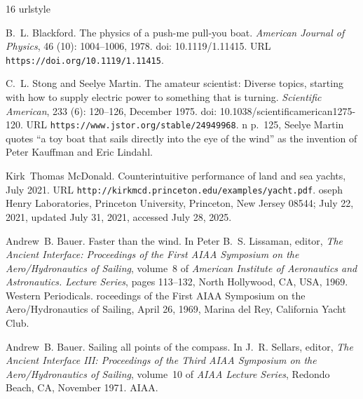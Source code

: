 \documentclass[a4paper]{article}
\begin{document}
\begin{thebibliography}{16}
\providecommand{\natexlab}[1]{#1}
\providecommand{\url}[1]{\texttt{#1}}
\expandafter\ifx\csname urlstyle\endcsname\relax
  \providecommand{\doi}[1]{doi: #1}\else
  \providecommand{\doi}{doi: \begingroup \urlstyle{rm}\Url}\fi

B.~L. Blackford.
\newblock The physics of a push-me pull-you boat.
\newblock \emph{American Journal of Physics}, 46 (10):
  1004--1006, 1978.
\newblock \doi{10.1119/1.11415}.
\newblock URL \url{https://doi.org/10.1119/1.11415}.

C.~L. Stong and Seelye Martin.
\newblock The amateur scientist: Diverse topics, starting with how to supply
  electric power to something that is turning.
\newblock \emph{Scientific American}, 233 (6): 120--126,
  December 1975.
\newblock \doi{10.1038/scientificamerican1275-120}.
\newblock URL \url{https://www.jstor.org/stable/24949968}.
n p.~125, Seelye Martin quotes ``a toy boat that sails directly
  into the eye of the wind'' as the invention of Peter Kauffman and Eric
  Lindahl.

Kirk~Thomas McDonald.
\newblock Counterintuitive performance of land and sea yachts, July 2021.
\newblock URL \url{http://kirkmcd.princeton.edu/examples/yacht.pdf}.
oseph {H}enry {L}aboratories, Princeton University, Princeton, New
  Jersey 08544; July 22, 2021, updated July 31, 2021, accessed July 28, 2025.

Andrew~B. Bauer.
\newblock Faster than the wind.
\newblock In Peter B.~S. Lissaman, editor, \emph{The Ancient Interface:
  {P}roceedings of the First {AIAA} Symposium on the Aero/Hydronautics of
  Sailing}, volume~8 of \emph{American Institute of Aeronautics and
  Astronautics. Lecture Series}, pages 113--132, North Hollywood, CA, USA,
  1969. Western Periodicals.
roceedings of the First {AIAA} Symposium on the Aero/Hydronautics
  of Sailing, {A}pril 26, 1969, {M}arina del {R}ey, {C}alifornia {Y}acht
  {C}lub.

Andrew~B. Bauer.
\newblock Sailing all points of the compass.
\newblock In J.~R. Sellars, editor, \emph{The Ancient Interface III:
  {P}roceedings of the Third {AIAA} Symposium on the Aero/Hydronautics of
  Sailing}, volume~10 of \emph{AIAA Lecture Series}, Redondo Beach, CA,
  November 1971. AIAA.


\end{thebibliography}
\end{document}
